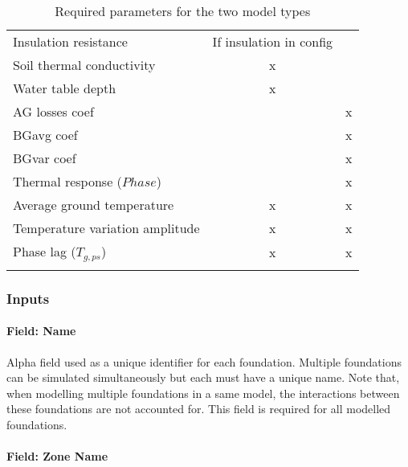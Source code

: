 \begin{longtable}{lcc}
Insulation resistance           & If insulation in config           &                           \\
Soil thermal conductivity       & x                                 &                           \\
Water table depth               & x                                 &                           \\
AG losses coef                  &                                   & x                         \\
BGavg coef                      &                                   & x                         \\
BGvar coef                      &                                   & x                         \\
Thermal response ($Phase$)      &                                   & x                         \\
Average ground temperature      & x                                 & x                         \\
Temperature variation amplitude & x                                 & x                         \\
Phase lag ($T_{g,ps}$)          & x                                 & x                         \\
\hline
\caption{Required parameters for the two model types} \label{table:BSFoundationParameters}
\end{longtable}


\subsubsection{Inputs}\label{inputs-basesimp}

\paragraph{Field: Name}\label{field-name-basesimp}

Alpha field used as a unique identifier for each foundation. Multiple foundations can be simulated simultaneously but each must have a unique name. Note that, when modelling multiple foundations in a same model, the interactions between these foundations are not accounted for.  This field is required for all modelled foundations.

\paragraph{Field: Zone Name}\label{field-zonename-basesimp}

